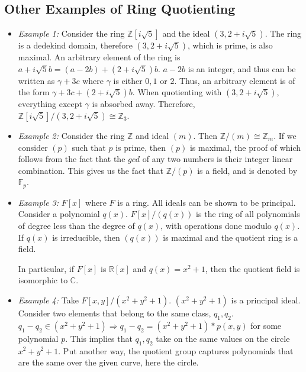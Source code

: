 \subsection{Other Examples of Ring Quotienting}
\begin{itemize}
  \item \emph{Example 1:} Consider the ring $\mathbb{Z}[i \sqrt{5}]$ and the ideal $(3, 2 + i \sqrt{5})$.
    The ring is a dedekind domain, therefore $(3, 2 + i \sqrt{5})$, which is prime, is also maximal.
    An arbitrary element of the ring is $a + i \sqrt{5}b = (a - 2b) + (2 + i \sqrt{5})b$.
    $a - 2b$ is an integer, and thus can be written as $\gamma + 3c$ where $\gamma$ is either $0, 1$ or $2$.
    Thus, an arbitrary element is of the form $\gamma + 3c + (2 + i \sqrt{5})b$.
    When quotienting with $(3, 2 + i \sqrt{5})$, everything except $\gamma$ is absorbed away.
    Therefore, $\mathbb{Z}[i \sqrt{5}] \big/ (3, 2 + i \sqrt{5}) \cong \mathbb{Z}_{3}$.
  \item \emph{Example 2:} Consider the ring $\mathbb{Z}$ and ideal $(m)$.
    Then $\mathbb{Z} \big/ (m) \cong \mathbb{Z}_{m}$.
    If we consider $(p)$ such that $p$ is prime, then $(p)$ is maximal, the proof of which follows from the fact that the $gcd$ of any two numbers is their integer linear combination.
    This gives us the fact that $\mathbb{Z} \big/ (p)$ is a field, and is denoted by $\mathbb{F}_{p}$.
  \item \emph{Example 3:} $F[x]$ where $F$ is a ring.
    All ideals can be shown to be principal.
    Consider a polynomial $q(x)$.
    $F[x] \big/ (q(x))$ is the ring of all polynomials of degree less than the degree of $q(x)$, with operations done modulo $q(x)$.
    If $q(x)$ is irreducible, then $(q(x))$ is maximal and the quotient ring is a field.
    \par
    In particular, if $F[x]$ is $\mathbb{R}[x]$ and $q(x) = x^{2} + 1$, then the quotient field is isomorphic to $\mathbb{C}$.
  \item \emph{Example 4:} Take $F[x, y] \big/ (x^{2} + y^{2} + 1)$.
    $(x^{2} + y^{2} + 1)$ is a principal ideal.
    Consider two elements that belong to the same class, $q_{1}, q_{2}$.
    $q_{1} - q_{2} \in (x^{2} + y^{2} + 1) \Rightarrow q_{1} - q_{2} = (x^{2} + y^{2} + 1) * p(x, y)$ for some polynomial $p$.
    This implies that $q_{1}, q_{2}$ take on the same values on the circle $x^{2} + y^{2} + 1$.
    Put another way, the quotient group captures polynomials that are the same over the given curve, here the circle.
\end{itemize}

